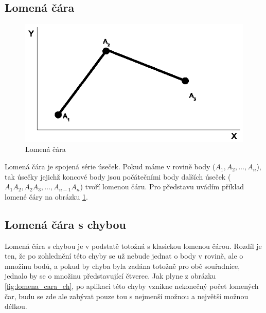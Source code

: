 \documentclass[12pt,a4paper,titlepage,final]{article}
\begin{document}
\subsection{Lomená čára}

\begin{figure}
  \centering
  \includegraphics{img/lomcara.eps}
  \caption{Lomená čára}
  \label{fig:lomena_cara}
\end{figure}

Lomená čára je spojená série úseček. Pokud máme v rovině body ($A_1,A_2,\dots,
A_n$), tak úsečky jejichž koncové body jsou počátečními body dalších úseček
($A_1A_2, A_2A_3,\dots,A_{n-1}A_n$) tvoří lomenou čáru.
Pro představu uvádím příklad lomené čáry na obrázku \ref{fig:lomena_cara}.


\subsection{Lomená čára s chybou}

Lomená čára s chybou je v podstatě totožná s klasickou lomenou čárou.
Rozdíl je ten, že po zohlednění této chyby se už nebude jednat o body v rovině,
ale o množinu bodů, a pokud by chyba byla zadána totožně pro obě souřadnice, 
jednalo by se o množinu představující čtverec. Jak plyne z obrázku
\ref{fig:lomena_cara_ch}, po aplikaci této chyby vznikne nekonečný počet
lomených čar, budu se zde ale zabývat pouze tou s nejmenší možnou a největší
možnou délkou.
\end{document}
